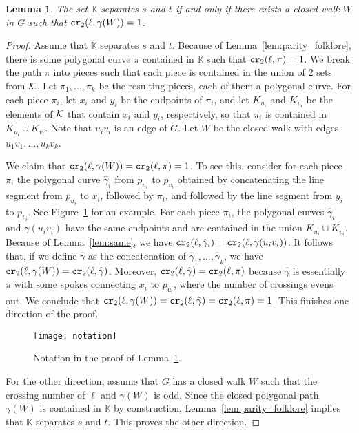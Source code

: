 \documentclass[a4paper,11pt]{article}
\newcommand{\KK}{\mathbb{K}}
\newcommand\CR{\mbox{\tt cr}_2}
\newtheorem{lemma}[theorem]{Lemma}
\begin{document}
\begin{lemma}
\label{lem:nerve}
	The set $\KK$ separates $s$ and $t$ if and only if
	there exists a closed walk $W$ in $G$ such that $\CR(\ell,\gamma(W))=1$.
\end{lemma}
\begin{proof}
	Assume that $\KK$ separates $s$ and $t$.
	Because of Lemma~\ref{lem:parity_folklore}, 
	there is some polygonal curve $\pi$ contained in $\KK$ such that $\CR(\ell,\pi)=1$. 
	We break the path $\pi$ into pieces such that each piece is contained
	in the union of $2$ sets from $\cal K$.
	Let $\pi_1,\dots ,\pi_k$ be the resulting pieces, each of them a polygonal curve. 
	For each piece $\pi_i$, let $x_i$ and $y_i$ be the endpoints
	of $\pi_i$, and let $K_{u_i}$ and $K_{v_i}$ be the elements of $\cal K$ that contain $x_i$ and $y_i$,
	respectively, so that $\pi_i$ is contained in $K_{u_i}\cup K_{v_i}$.
	Note that $u_i v_i$ is an edge of $G$. 
	Let $W$ be the closed walk with edges $u_1v_1,\dots, u_kv_k$.
	
	We claim that $\CR(\ell,\gamma(W))=\CR(\ell,\pi)=1$. 
	To see this, consider for each piece $\pi_i$ the polygonal curve 
	$\hat\gamma_i$ from $p_{u_i}$ to $p_{v_i}$ obtained by concatenating 
	the line segment from $p_{u_i}$ to $x_i$, 
	followed by $\pi_i$, 
	and followed by the line segment from $y_i$ to $p_{v_i}$. 
	See Figure~\ref{fig:notation} for an example.
	For each piece $\pi_i$, the polygonal curves $\hat\gamma_i$ and $\gamma(u_iv_i)$ have the same
	endpoints and are contained in the union $K_{u_i}\cup K_{v_i}$.
	Because of Lemma~\ref{lem:same}, we have
	$\CR(\ell,\hat\gamma_i)=\CR(\ell,\gamma(u_iv_i))$.
	It follows that, if we define $\hat\gamma$ as the concatenation of $\hat\gamma_1,\dots ,\hat\gamma_k$,
	we have $\CR(\ell,\gamma(W))=\CR(\ell, \hat\gamma)$. 
	Moreover, $\CR(\ell,\hat\gamma)=\CR(\ell, \pi)$
	because $\hat\gamma$ is essentially $\pi$ with some spokes connecting $x_i$ to $p_{u_i}$,
	where the number of crossings evens out.
	We conclude that $\CR(\ell,\gamma(W))= \CR(\ell,\hat\gamma)=\CR(\ell, \pi)=1$.
	This finishes one direction of the proof.
	
	\begin{figure}[thb]
	\centering
		\texttt{[image: notation]}
		\caption{Notation in the proof of Lemma~\ref{lem:nerve}.}
		\label{fig:notation}
	\end{figure}

	For the other direction, assume that $G$ has a closed walk $W$ such that the crossing
	number of $\ell$ and $\gamma(W)$ is odd. Since the closed polygonal path
	$\gamma(W)$ is contained in $\KK$ by
	construction, Lemma~\ref{lem:parity_folklore} implies that $\KK$ separates $s$ and $t$.
	This proves the other direction.
\end{proof}
\end{document}
